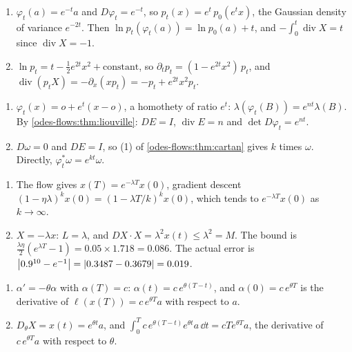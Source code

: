 \begin{enumerate}[nosep]
  \item $\varphi_t(a) = e^{-t}a$ and $D\varphi_t = e^{-t}$, so
        $p_t(x) = e^t\,p_0(e^tx)$, the Gaussian density of variance
        $e^{-2t}$. Then
        $\ln p_t(\varphi_t(a)) = \ln p_0(a) + t$, and
        $-\int_0^t\operatorname{div}X = t$ since
        $\operatorname{div}X = -1$.
  \item $\ln p_t = t - \frac12e^{2t}x^2 + \text{constant}$, so
        $\partial_tp_t = (1 - e^{2t}x^2)\,p_t$, and
        $\operatorname{div}(p_tX) = -\partial_x(xp_t)
        = -p_t + e^{2t}x^2p_t$.
\end{enumerate}

\begin{enumerate}[nosep]
  \item $\varphi_t(x) = o + e^t(x - o)$, a homothety of ratio $e^t$:
        $\lambda(\varphi_t(B)) = e^{nt}\lambda(B)$. By
        \cref{odes-flows:thm:liouville}: $DE = I$,
        $\operatorname{div}E = n$ and
        $\det D\varphi_t = e^{nt}$.
  \item $D\omega = 0$ and $DE = I$, so (1) of
        \cref{odes-flows:thm:cartan} gives $k$ times $\omega$.
        Directly, $\varphi_t^*\omega = e^{kt}\omega$.
\end{enumerate}

\begin{enumerate}[nosep]
  \item The flow gives $x(T) = e^{-\lambda T}x(0)$, gradient descent
        $(1 - \eta\lambda)^kx(0) = (1 - \lambda T/k)^kx(0)$, which
        tends to $e^{-\lambda T}x(0)$ as $k\to\infty$.
  \item $X = -\lambda x$: $L = \lambda$, and
        $DX\cdot X = \lambda^2x(t)\leq\lambda^2 = M$. The bound is
        $\frac{\lambda\eta}2(e^{\lambda T} - 1) = 0.05\times1.718
        = 0.086$. The actual error is
        $\left|0.9^{10} - e^{-1}\right| = \left|0.3487 - 0.3679\right| = 0.019$.
\end{enumerate}

\begin{enumerate}[nosep]
  \item $\alpha' = -\theta\alpha$ with $\alpha(T) = c$:
        $\alpha(t) = c\,e^{\theta(T - t)}$, and
        $\alpha(0) = c\,e^{\theta T}$ is the derivative of
        $\ell(x(T)) = c\,e^{\theta T}a$ with respect to $a$.
  \item $D_\theta X = x(t) = e^{\theta t}a$, and
        $\int_0^Tc\,e^{\theta(T - t)}e^{\theta t}a\,\dd t
        = cTe^{\theta T}a$, the derivative of $c\,e^{\theta T}a$ with
        respect to $\theta$.
\end{enumerate}

